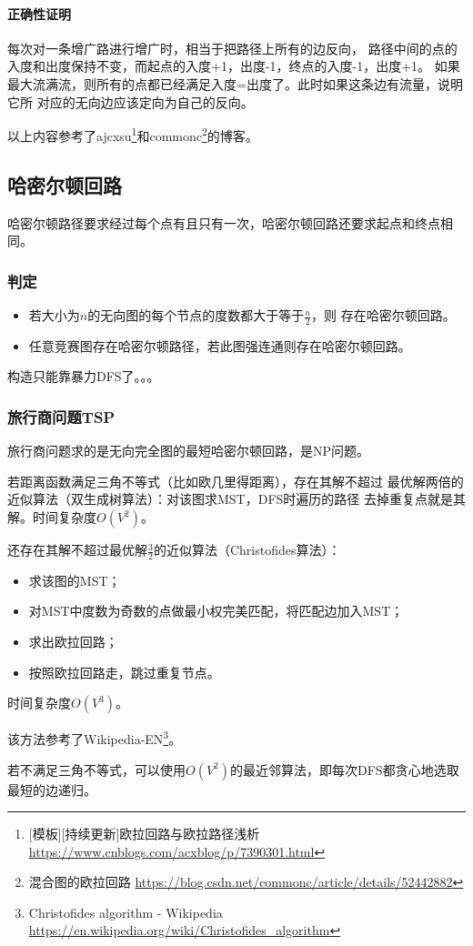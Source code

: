 \paragraph{正确性证明} 每次对一条增广路进行增广时，相当于把路径上所有的边反向，
路径中间的点的入度和出度保持不变，而起点的入度+1，出度-1，终点的入度-1，出度+1。
如果最大流满流，则所有的点都已经满足入度=出度了。此时如果这条边有流量，说明它所
对应的无向边应该定向为自己的反向。

以上内容参考了ajcxsu\footnote{[模板][持续更新]欧拉回路与欧拉路径浅析
    \url{https://www.cnblogs.com/acxblog/p/7390301.html}
}和commonc\footnote{混合图的欧拉回路
    \url{https://blog.csdn.net/commonc/article/details/52442882}
}的博客。
\subsection{哈密尔顿回路}
哈密尔顿路径要求经过每个点有且只有一次，哈密尔顿回路还要求起点和终点相同。

\subsubsection{判定}
\begin{itemize}
    \item \begin{theorem}
        若大小为$n$的无向图的每个节点的度数都大于等于$\frac{n}{2}$，则
        存在哈密尔顿回路。
    \end{theorem}
    \item \begin{theorem}
        任意竞赛图存在哈密尔顿路径，若此图强连通则存在哈密尔顿回路。
    \end{theorem}
\end{itemize}
构造只能靠暴力DFS了。。。
\subsubsection{旅行商问题TSP}
旅行商问题求的是无向完全图的最短哈密尔顿回路，是NP问题。

若距离函数满足三角不等式（比如欧几里得距离），存在其解不超过
最优解两倍的近似算法（双生成树算法）：对该图求MST，DFS时遍历的路径
去掉重复点就是其解。时间复杂度$O(V^2)$。

还存在其解不超过最优解$\frac{3}{2}$的近似算法（Christofides算法）：
\begin{itemize}
    \item 求该图的MST；
    \item 对MST中度数为奇数的点做最小权完美匹配，将匹配边加入MST；
    \item 求出欧拉回路；
    \item 按照欧拉回路走，跳过重复节点。
\end{itemize}
时间复杂度$O(V^3)$。


该方法参考了Wikipedia-EN\footnote{Christofides algorithm - Wikipedia\\
    \url{https://en.wikipedia.org/wiki/Christofides\_algorithm}
}。

若不满足三角不等式，可以使用$O(V^2)$的最近邻算法，即每次DFS都贪心地选取
最短的边递归。
